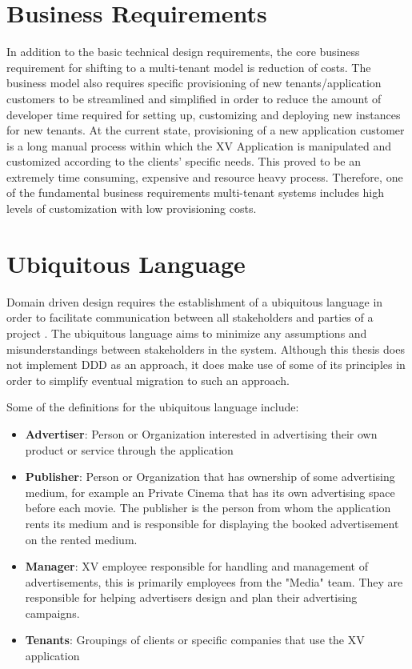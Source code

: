 \section{Business Requirements}

In addition to the basic technical design requirements, the core business requirement for shifting to a multi-tenant model is reduction of costs. The business model also requires specific provisioning of new tenants/application customers to be streamlined and simplified in order to reduce the amount of developer time required for setting up, customizing and deploying new instances for new tenants. At the current state, provisioning of a new application customer is a long manual process within which the XV Application is manipulated and customized according to the clients' specific needs. This proved to be an extremely time consuming, expensive and resource heavy process. Therefore, one of the fundamental business requirements multi-tenant systems includes high levels of customization with low provisioning costs.

\section{Ubiquitous Language}
Domain driven design requires the establishment of a ubiquitous language in order to facilitate communication between all stakeholders and parties of a project \cite{Evans2003}. The ubiquitous language aims to minimize any assumptions and misunderstandings between stakeholders in the system.  Although this thesis does not implement DDD as an approach, it does make use of some of its principles in order to simplify eventual migration to such an approach.

Some of the definitions for the ubiquitous language include: 
\begin{itemize}
\item \textbf{Advertiser}: Person or Organization interested in advertising their own product or service through the application
\item \textbf{Publisher}: Person or Organization that has ownership of some advertising medium, for example an Private Cinema that has its own advertising space before each movie. The publisher is the person from whom the application rents its medium and is responsible for displaying the booked advertisement on the rented medium. 
\item \textbf{Manager}: XV employee responsible for handling and management of advertisements, this is primarily employees from the "Media" team. They are responsible for helping advertisers design and plan their advertising campaigns.
\item \textbf{Tenants}: Groupings of clients or specific companies that use the XV application
\end{itemize}	


